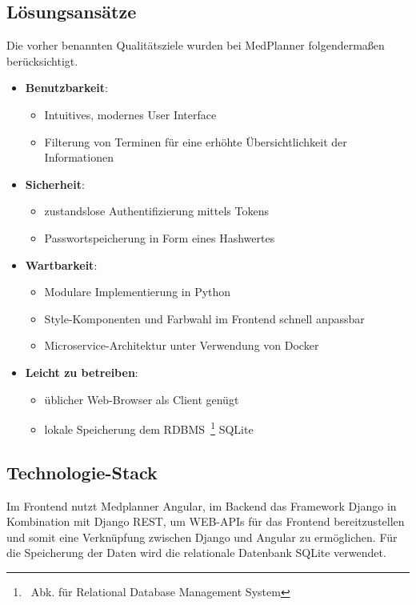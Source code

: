 \documentclass[conference]{IEEEtran}
\begin{document}
\subsection{Lösungsansätze}
Die vorher benannten Qualitätsziele wurden bei MedPlanner folgendermaßen berücksichtigt.\\
\begin{itemize}
	\item \textbf{Benutzbarkeit}:
	\begin{itemize}
		\item Intuitives, modernes User Interface
		\item Filterung von Terminen für eine erhöhte Übersichtlichkeit der Informationen
	\end{itemize}
	\pagebreak
	\item \textbf{Sicherheit}:
	\begin{itemize}
		\item zustandslose Authentifizierung mittels Tokens
		\item Passwortspeicherung in Form eines Hashwertes
	\end{itemize}
	\item \textbf{Wartbarkeit}:
	\begin{itemize}
		\item Modulare Implementierung in Python
		\item Style-Komponenten und Farbwahl im Frontend schnell anpassbar
		\item Microservice-Architektur unter Verwendung von Docker
	\end{itemize}
	\item \textbf{Leicht zu betreiben}:
	\begin{itemize}
		\item üblicher Web-Browser als Client genügt
		\item lokale Speicherung dem RDBMS~\footnote{~Abk. für Relational Database Management System} SQLite
	\end{itemize}	
\end{itemize}

\subsection{Technologie-Stack}
Im Frontend nutzt Medplanner Angular, im Backend das Framework Django in Kombination mit Django REST, um WEB-APIs für das Frontend bereitzustellen und somit eine Verknüpfung zwischen Django und Angular zu ermöglichen. Für die Speicherung der Daten wird die relationale Datenbank SQLite verwendet. 
\end{document}
